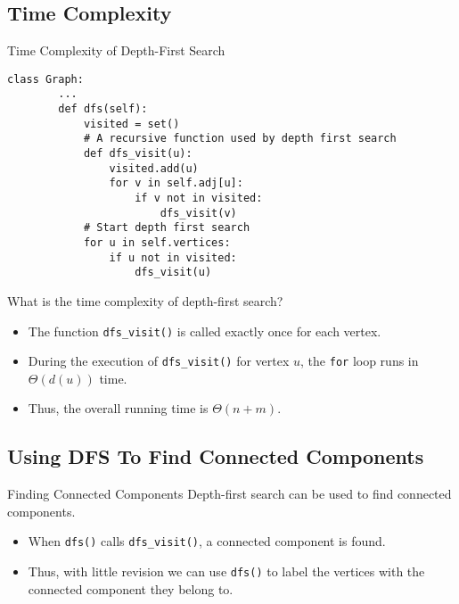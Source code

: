 \documentclass{beamer}
\begin{document}
\subsection{Time Complexity}
\begin{frame}[fragile]{Time Complexity of Depth-First Search}
  \begin{block}{}
    \tiny
    \begin{lstlisting}[gobble=4]
    class Graph:
        ...
        def dfs(self):
            visited = set()
            # A recursive function used by depth first search
            def dfs_visit(u):
                visited.add(u)
                for v in self.adj[u]:
                    if v not in visited:
                        dfs_visit(v)
            # Start depth first search
            for u in self.vertices:
                if u not in visited:
                    dfs_visit(u)
    \end{lstlisting}
  \end{block}
  What is the time complexity of depth-first search? \pause
  \begin{itemize}
    \item The function \lstinline{dfs_visit()} is called exactly once for each
    vertex. \pause
    \item During the execution of \lstinline{dfs_visit()} for vertex $u$, the
    \lstinline{for} loop runs in $\Theta(d(u))$ time. \pause
    \item Thus, the overall running time is $\Theta(n + m)$.
  \end{itemize}
\end{frame}

\subsection{Using DFS To Find Connected Components}
\begin{frame}{Finding Connected Components}
  Depth-first search can be used to find connected components. \pause
  \begin{itemize}
    \item When \lstinline{dfs()} calls \lstinline{dfs_visit()}, a connected
    component is found. \pause
    \item Thus, with little revision we can use \lstinline{dfs()} to label
    the vertices with the connected component they belong to.
  \end{itemize}
\end{frame}
\end{document}

